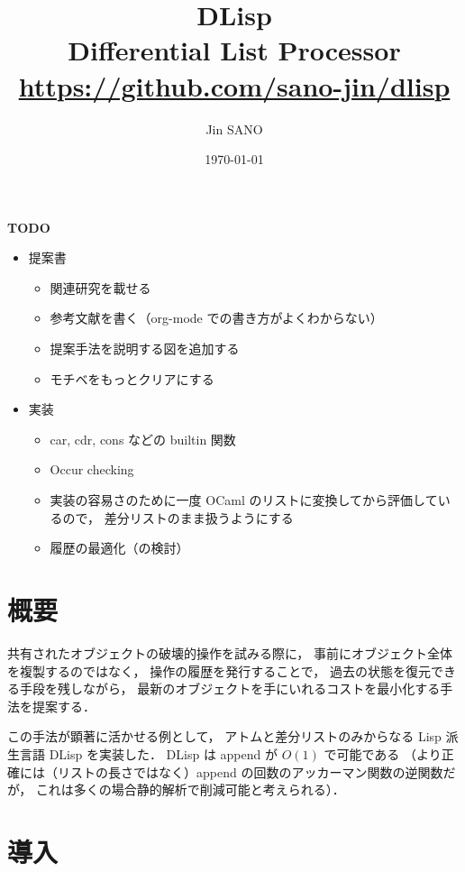 \documentclass[10pt, a4j, twocolumn]{scrartcl}
\author{Jin SANO}
\date{\today}
\title{DLisp\\\medskip
\large Differential List Processor \\ \url{https://github.com/sano-jin/dlisp}}
\begin{document}
\maketitle
\tableofcontents

\vspace{1em}

\textbf{\textbf{TODO}} 

\begin{itemize}
\item 提案書
\begin{itemize}
\item 関連研究を載せる
\item 参考文献を書く（org-mode での書き方がよくわからない）
\item 提案手法を説明する図を追加する
\item モチベをもっとクリアにする
\end{itemize}

\item 実装
\begin{itemize}
\item car, cdr, cons などの builtin 関数
\item Occur checking
\item 実装の容易さのために一度 OCaml のリストに変換してから評価しているので，
差分リストのまま扱うようにする
\item 履歴の最適化（の検討）
\end{itemize}
\end{itemize}


\section{概要}
\label{sec:orgdba7b56}

共有されたオブジェクトの破壊的操作を試みる際に，
事前にオブジェクト全体を複製するのではなく，
操作の履歴を発行することで，
過去の状態を復元できる手段を残しながら，
最新のオブジェクトを手にいれるコストを最小化する手法を提案する．

この手法が顕著に活かせる例として，
アトムと差分リストのみからなる Lisp 派生言語 DLisp を実装した．
DLisp は append が \(O(1)\) で可能である
（より正確には（リストの長さではなく）append の回数のアッカーマン関数の逆関数だが，
これは多くの場合静的解析で削減可能と考えられる）．


\section{導入}
\label{sec:org21c94d8}
\end{document}
